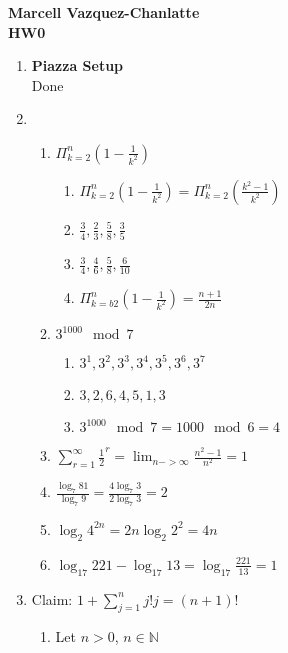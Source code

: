 \documentclass[12pt]{article}
\begin{document}
\begin{center}
  {\LARGE
    \textbf{Marcell Vazquez-Chanlatte}
    \\
    \textbf{HW0}
    \\[1ex]}
\end{center}

\begin{enumerate}

\item
  \textbf{Piazza Setup}\\
  Done
\item

  \begin{enumerate}
  \item $\Pi^{n}_{k=2}(1-\frac{1}{k^2})$
    \begin{enumerate}
    \item $\Pi^{n}_{k=2}(1-\frac{1}{k^2}) = \Pi^{n}_{k=2}(\frac{k^2-1}{k^2})$
    \item $\frac{3}{4},\frac{2}{3},\frac{5}{8},\frac{3}{5}$
    \item $\frac{3}{4},\frac{4}{6},\frac{5}{8},\frac{6}{10}$
    \item $\Pi^{n}_{k=b2}(1-\frac{1}{k^2})=\frac{n+1}{2n}$
    \end{enumerate}
  \item $3^{1000} \mod{7}$
    \begin{enumerate}
    \item $3^1,3^2,3^3,3^4,3^5,3^6,3^7$
    \item $3,2,6,4,5,1,3$
    \item $3^{1000 }\mod{7} = 1000 \mod{6} = 4$
    \end{enumerate}  
  \item $\sum\limits_{r=1}^\infty\frac{1}{2}^r = \lim_{n -> \infty}
    \frac{n^2-1}{n^2} = 1$
  \item $\frac{\log_7{81}}{\log_7{9}} = \frac{4\log_7{3}}{2\log_7{3}} =
    2$
  \item $\log_2{4^{2n}}=2n\log_2{2^2}=4n$
  \item $\log_{17}221-\log_{17}13=\log_{17}\frac{221}{13}=1$
  \end{enumerate}
\item Claim: $1+\sum_{j=1}^n{j!j}= (n+1)!$
  \begin{enumerate}
  \item Let $n>0$, $n\in\mathbb{N}$

\end{enumerate}
\end{enumerate}
\end{document}
